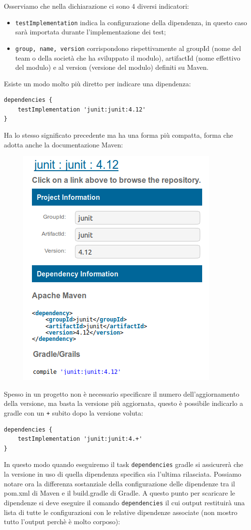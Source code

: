 Osserviamo che nella dichiarazione ci sono 4 diversi indicatori:
\begin{itemize}
    \item \texttt{testImplementation} indica la configurazione della dipendenza, in questo caso sarà importata durante l'implementazione dei test;
    \item \texttt{group, name, version} corrispondono rispettivamente al groupId (nome del team o della società che ha sviluppato il modulo), artifactId (nome effettivo del modulo) e al version (versione del modulo) definiti su Maven.
\end{itemize}
Esiste un modo molto più diretto per indicare una dipendenza:
\begin{lstlisting}[frame=single]
dependencies {
    testImplementation 'junit:junit:4.12'
} \end{lstlisting}
Ha lo stesso significato precedente ma ha una forma più compatta, forma che adotta anche la documentazione Maven:
\begin{figure}[H]
\centering
\includegraphics[width=0.4\linewidth]{3DependencyManagement/javaPlug/gradleInMavenRepo.png}
\end{figure}
Spesso in un progetto non è necessario specificare il numero dell'aggiornamento della versione, ma basta la versione più aggiornata, questo è possibile indicarlo a gradle con un \texttt{+} subito dopo la versione voluta:
\begin{lstlisting}[frame=single]
dependencies {
    testImplementation 'junit:junit:4.+'
} \end{lstlisting}
In questo modo quando eseguiremo il task \texttt{dependencies} gradle si assicurerà che la versione in uso di quella dipendenza specifica sia l'ultima rilasciata. Possiamo notare ora la differenza sostanziale della configurazione delle dipendenze tra il pom.xml di Maven e il build.gradle di Gradle. A questo punto per scaricare le dipendenze si deve eseguire il comando \texttt{dependencies} il cui output restituirà una lista di tutte le configurazioni con le relative dipendenze associate (non mostro tutto l'output perchè è molto corposo):
